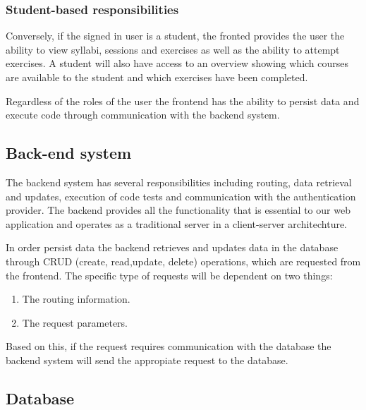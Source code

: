 \subsubsection*{Student-based responsibilities}
Conversely, if the signed in user is a student, the fronted provides the user the ability to view syllabi, sessions and exercises as well as the ability to attempt exercises. A student will also have access to an overview showing which courses are available to the student and which exercises have been completed. 

\vspace{0.5cm}

Regardless of the roles of the user the frontend has the ability to persist data and execute code through communication with the backend system.


\subsection{Back-end system}
The backend system has several responsibilities including routing, data retrieval and updates, execution of code tests and communication with the authentication provider. The backend provides all the functionality that is essential to our web application and operates as a traditional server in a client-server architechture. 

In order persist data the backend retrieves and updates data in the database through CRUD (create, read,update, delete) operations, which are requested from the frontend. The specific type of requests will be dependent on two things:
\begin{enumerate}
	\item The routing information.
	\item The request parameters.
\end{enumerate}

Based on this, if the request requires communication with the database the backend system will send the appropiate request to the database.

\subsection{Database}
